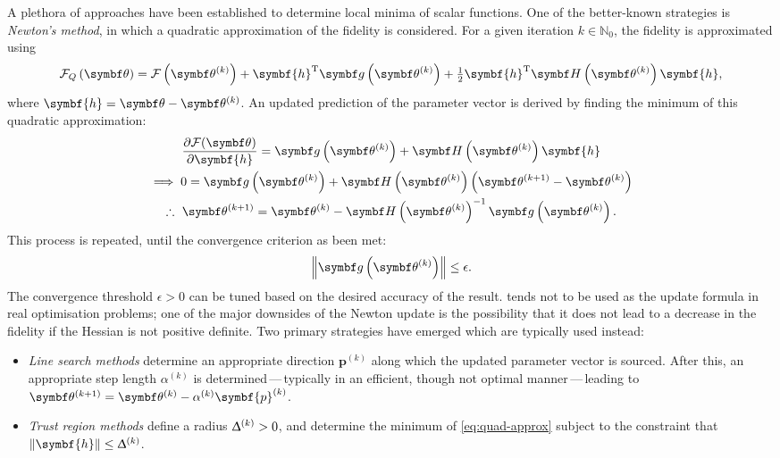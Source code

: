A plethora of approaches have been established to determine local minima of
scalar functions. One of the better-known strategies is \emph{Newton's method},
in which a quadratic approximation of the fidelity is considered.
For a given iteration $k \in \mathbb{N}_0$, the fidelity is approximated using
\begin{equation}
    \FQth =
        \Fthk +
        \symbf{h}\T \bdgthk +
        \tfrac{1}{2} \symbf{h}^{\mathrm{T}} \bdHthk \symbf{h},
    \label{eq:quad-approx}
\end{equation}
where $\symbf{h} = \bth - \bthk$.  An updated prediction of the parameter
vector is derived by finding the minimum of this quadratic approximation:
\begin{gather}
    \frac{\partial \Fth}{\partial \symbf{h}} =
        \bdgthk + \bdHthk \symbf{h} \notag\\
    \implies 0 = \bdgthk + \bdHthk \left(\bthkplusone - \bthk\right) \notag\\
    \therefore\ \bthkplusone =
        \bthk - \bdHthk^{-1}
        \bdgthk.\label{eq:newton-update}
\end{gather}
This process is repeated, until the convergence criterion as been met:
\begin{equation}
    \left\lVert \bdgthk \right\rVert \leq \epsilon.
\end{equation}
The convergence threshold $\epsilon > 0$ can be tuned based on the desired
accuracy of the result.
 tends not to be used as the update formula in real
optimisation problems; one of the major downsides of the Newton update is the
possibility that it does not lead to a decrease in the fidelity if the Hessian
is not positive definite. Two primary strategies have emerged which are
typically used instead:
\begin{itemize}
    \item \emph{Line search methods}\cite[Chapter 3]{Nocedal2006} determine an
        appropriate direction $\symbf{p}^{(k)}$ along which the updated
        parameter vector is sourced.  After this, an appropriate step length
        $\alpha^{(k)}$ is determined\,---\,typically in an efficient, though not
        optimal manner\,---\,leading to $\bthkplusone = \bthk - \alpha^{(k)}\symbf{p}^{(k)}$.
    \item \emph{Trust region methods}\cite[Chapter 4]{Nocedal2006} define a
        radius $\Updelta^{(k)} > 0$, and determine the minimum of
        \cref{eq:quad-approx} subject to the constraint that
        $\left\lVert\symbf{h}\right\rVert \leq \Updelta^{(k)}$.
\end{itemize}


